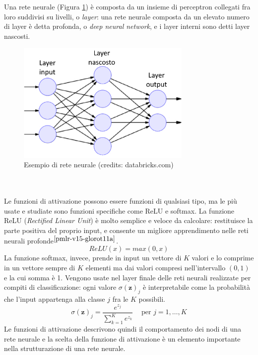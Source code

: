 Una rete neurale (Figura \ref{fig:reteneurale}) è composta da un insieme di perceptron collegati fra loro suddivisi su livelli, o \textit{layer}: una rete neurale composta da un elevato numero di layer è detta profonda, o \textit{deep neural network}, e i layer interni sono detti layer nascosti.
\begin{figure}[h]
	\begin{center}
		\includegraphics[width=0.75\textwidth]{img/reteneurale.jpg}
		\caption{Esempio di rete neurale (credits: databricks.com)}
		\label{fig:reteneurale}
	\end{center}
\end{figure}
\\\\
Le funzioni di attivazione possono essere funzioni di qualsiasi tipo, ma le più usate e studiate sono funzioni specifiche come ReLU e softmax. La funzione ReLU (\textit{Rectified Linear Unit}) è molto semplice e veloce da calcolare: restituisce la parte positiva del proprio input, e consente un migliore apprendimento nelle reti neurali profonde$^{\cite{pmlr-v15-glorot11a}}$.
\begin{equation}\label{eq:fun_relu}
ReLU(x) = max(0, x)
\end{equation}
La funzione softmax, invece, prende in input un vettore di $K$ valori e lo comprime in un vettore sempre di $K$ elementi ma dai valori compresi nell'intervallo $(0, 1)$ e la cui somma è 1. Vengono usate nel layer finale delle reti neurali realizzate per compiti di classificazione: ogni valore $\sigma(\textbf{z})_j$  è interpretabile come la probabilità che l'input appartenga alla classe $j$ fra le $K$ possibili.
\begin{equation}\label{eq:fun_softmax}
\sigma(\textbf{z})_j = \frac{e^{z_j}}{\sum_{k=1}^K e^{z_k}}\:\:\:\:\mbox{ per }j = 1,\ldots,K
\end{equation}
Le funzioni di attivazione descrivono quindi il comportamento dei nodi di una rete neurale e la scelta della funzione di attivazione è un elemento importante nella strutturazione di una rete neurale.
